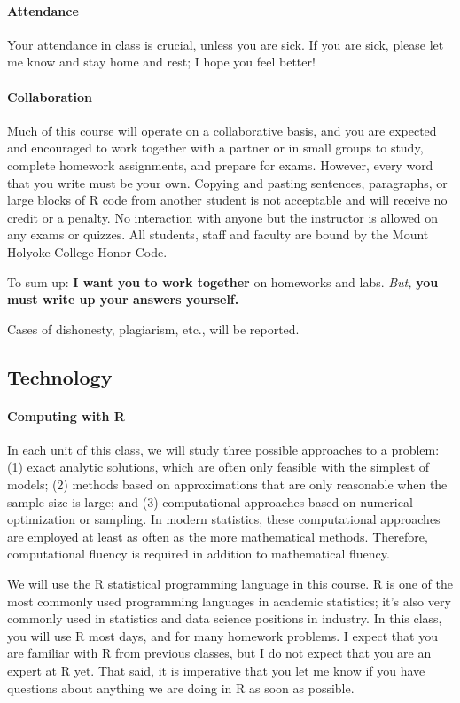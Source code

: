 \documentclass[11pt]{article}
\begin{document}
\paragraph{Attendance}

Your attendance in class is crucial, unless you are sick.  If you are sick, please let me know and stay home and rest; I hope you feel better!

\paragraph{Collaboration}

Much of this course will operate on a collaborative basis, and you are expected and encouraged to work together with a partner or in small groups to study, complete homework assignments, and prepare for exams. However, every word that you write must be your own.  Copying and pasting sentences, paragraphs, or large blocks of R code from another student is not acceptable and will receive no credit or a penalty.  No interaction with anyone but the instructor is allowed on any exams or quizzes.  All students, staff and faculty are bound by the Mount Holyoke College Honor Code.

To sum up: \textbf{I want you to work together} on homeworks and labs.  \emph{But,} \textbf{you must write up your answers yourself.}

Cases of dishonesty, plagiarism, etc., will be reported.

\subsection*{Technology}

\paragraph{Computing with R}

In each unit of this class, we will study three possible approaches to a problem: (1) exact analytic solutions, which are often only feasible with the simplest of models; (2) methods based on approximations that are only reasonable when the sample size is large; and (3) computational approaches based on numerical optimization or sampling.  In modern statistics, these computational approaches are employed at least as often as the more mathematical methods.  Therefore, computational fluency is required in addition to mathematical fluency.

We will use the R statistical programming language in this course.  R is one of the most commonly used programming languages in academic statistics; it's also very commonly used in statistics and data science positions in industry.  In this class, you will use R most days, and for many homework problems.  I expect that you are familiar with R from previous classes, but I do not expect that you are an expert at R yet.  That said, it is imperative that you let me know if you have questions about anything we are doing in R as soon as possible.
\end{document}
